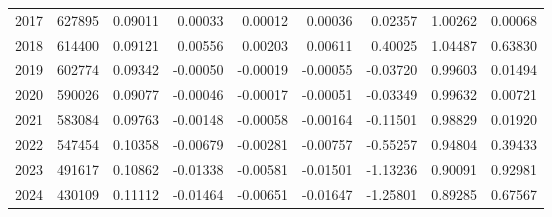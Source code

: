 \begin{tabular}{rrrrrrrrr}
2017 & 627895 & 0.09011 & 0.00033 & 0.00012 & 0.00036 & 0.02357 & 1.00262 & 0.00068 \\
2018 & 614400 & 0.09121 & 0.00556 & 0.00203 & 0.00611 & 0.40025 & 1.04487 & 0.63830 \\
2019 & 602774 & 0.09342 & -0.00050 & -0.00019 & -0.00055 & -0.03720 & 0.99603 & 0.01494 \\
2020 & 590026 & 0.09077 & -0.00046 & -0.00017 & -0.00051 & -0.03349 & 0.99632 & 0.00721 \\
2021 & 583084 & 0.09763 & -0.00148 & -0.00058 & -0.00164 & -0.11501 & 0.98829 & 0.01920 \\
2022 & 547454 & 0.10358 & -0.00679 & -0.00281 & -0.00757 & -0.55257 & 0.94804 & 0.39433 \\
2023 & 491617 & 0.10862 & -0.01338 & -0.00581 & -0.01501 & -1.13236 & 0.90091 & 0.92981 \\
2024 & 430109 & 0.11112 & -0.01464 & -0.00651 & -0.01647 & -1.25801 & 0.89285 & 0.67567 \\
\bottomrule
\end{tabular}
